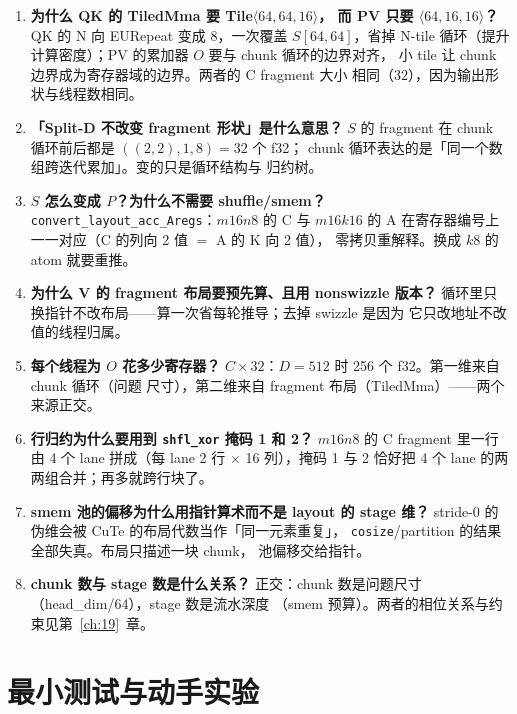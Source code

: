 \begin{enumerate}[itemsep=3pt,topsep=3pt]
  \item \textbf{为什么 QK 的 TiledMma 要 Tile$\langle64,64,16\rangle$，
        而 PV 只要 $\langle64,16,16\rangle$？}
        QK 的 N 向 EURepeat 变成 8，一次覆盖 $S[64,64]$，省掉 N-tile
        循环（提升计算密度）；PV 的累加器 $O$ 要与 chunk 循环的边界对齐，
        小 tile 让 chunk 边界成为寄存器域的边界。两者的 C fragment 大小
        相同（$32$），因为输出形状与线程数相同。
  \item \textbf{「Split-D 不改变 fragment 形状」是什么意思？}
        $S$ 的 fragment 在 chunk 循环前后都是 $((2,2),1,8)=32$ 个 f32；
        chunk 循环表达的是「同一个数组跨迭代累加」。变的只是循环结构与
        归约树。
  \item \textbf{$S$ 怎么变成 $P$？为什么不需要 shuffle/smem？}
        \texttt{convert\_\allowbreak{}layout\_\allowbreak{}acc\_\allowbreak{}Aregs}：$m16n8$ 的 C 与 $m16k16$ 的 A
        在寄存器编号上一一对应（C 的列向 2 值 $=$ A 的 K 向 2 值），
        零拷贝重解释。换成 $k8$ 的 atom 就要重推。
  \item \textbf{为什么 V 的 fragment 布局要预先算、且用 nonswizzle 版本？}
        循环里只换指针不改布局——算一次省每轮推导；去掉 swizzle 是因为
        它只改地址不改值的线程归属。
  \item \textbf{每个线程为 $O$ 花多少寄存器？}
        $C\times32$：$D=512$ 时 256 个 f32。第一维来自 chunk 循环（问题
        尺寸），第二维来自 fragment 布局（TiledMma）——两个来源正交。
  \item \textbf{行归约为什么要用到 \texttt{shfl\_xor} 掩码 1 和 2？}
        $m16n8$ 的 C fragment 里一行由 4 个 lane 拼成（每 lane 2 行 $\times$
        16 列），掩码 1 与 2 恰好把 4 个 lane 的两两组合并；再多就跨行块了。
  \item \textbf{smem 池的偏移为什么用指针算术而不是 layout 的 stage 维？}
        stride-0 的伪维会被 CuTe 的布局代数当作「同一元素重复」，
        \texttt{cosize}/partition 的结果全部失真。布局只描述一块 chunk，
        池偏移交给指针。
  \item \textbf{chunk 数与 stage 数是什么关系？}
        正交：chunk 数是问题尺寸（head\_dim/64），stage 数是流水深度
        （smem 预算）。两者的相位关系与约束见第~\ref{ch:19}~章。
\end{enumerate}

\section{最小测试与动手实验}

